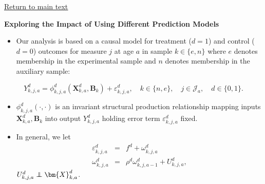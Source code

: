 \documentclass[static]{JJH-Beamer}
\newcommand\independent{\protect\mathpalette{\protect\independenT}{\perp}}
\def\independenT#1#2{\mathrel{\rlap{$#1#2$}\mkern2mu{#1#2}}}
\begin{document}
\begin{frame}
 \addtocounter{framenumber}{-1}

\begin{center}
\hyperlink{ret:frosting}{\underline{Return to main text}}
\end{center}

\end{frame}

\begin{frame}
 \addtocounter{framenumber}{-1}

\hypertarget{candycane}{}
\begin{center}
\textbf{Exploring the Impact of Using Different Prediction Models}
\end{center}

\end{frame}

\begin{frame}
 \addtocounter{framenumber}{-1}

\begin{itemize}
\item Our analysis is based on a causal model for treatment ($d=1$) and control ($d=0$) outcomes for measure $j$ at age $a$ in sample $k \in \{e,n\}$ where $e$ denotes membership in the experimental sample and $n$ denotes membership in the auxiliary sample:
\end{itemize}

\begin{equation}\label{eq:outcome}
 Y^d_{k,j,a} = \phi^d_{k,j,a} (\bm{X}^d_{k,a}, \bm{B}_k) + \varepsilon^d_{k,j,a}, \quad k \in \{n,e\}, \quad j \in \mathcal{J}_a, \quad d \in \{0, 1\}.
 \end{equation}

\begin{itemize}
\item $\phi^d_{k,j,a}\left( \cdot, \cdot \right)$ is an invariant structural production relationship mapping inputs $\bm{X}^d_{k,a}, \bm{B}_k$ into output $Y^d_{k,j,a}$ holding error term $\varepsilon^d_{k,j,a}$ fixed.
\end{itemize}

\end{frame}

\begin{frame}
 \addtocounter{framenumber}{-1}

\begin{itemize}
\item In general, we let
    \begin{eqnarray}
    \varepsilon^d_{k,j,a} &=& f^d + \omega^d_{k,j,a} \nonumber \\
    \omega^d_{k,j,a}      &=& \rho^d \omega^d_{k,j,a-1} + U^d_{k,j,a},
    \end{eqnarray}
$U^d_{k,j,a} \independent \bm{X}^d_{k,a}$.
\end{itemize}

\end{frame}
\end{document}
